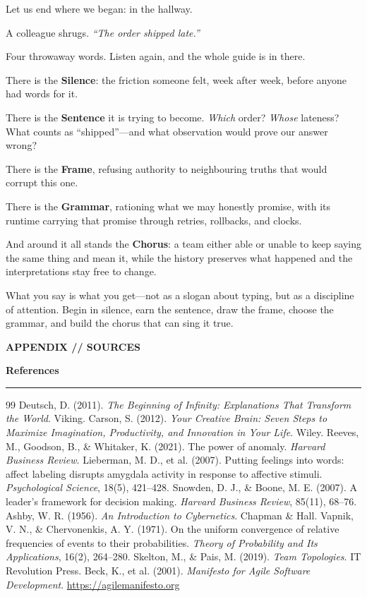 \documentclass[10pt,a4paper]{article}
\newcommand{\SectionTitle}[2]{%
  {\ttfamily\bfseries\footnotesize\textcolor{G2}{#1}\par}\vspace{1.4mm}%
  {\sffamily\bfseries\fontsize{22}{26}\selectfont #2\par}\vspace{2mm}%
  {\color{Ink}\rule{\linewidth}{1pt}\par}\vspace{4mm}%
}
\begin{document}
Let us end where we began: in the hallway.

A colleague shrugs. \emph{“The order shipped late.”}

Four throwaway words. Listen again, and the whole guide is in there.

There is the \textbf{Silence}: the friction someone felt, week after week, before anyone had words for it.

There is the \textbf{Sentence} it is trying to become. \emph{Which} order? \emph{Whose} lateness? What counts as “shipped”—and what observation would prove our answer wrong?

There is the \textbf{Frame}, refusing authority to neighbouring truths that would corrupt this one.

There is the \textbf{Grammar}, rationing what we may honestly promise, with its runtime carrying that promise through retries, rollbacks, and clocks.

And around it all stands the \textbf{Chorus}: a team either able or unable to keep saying the same thing and mean it, while the history preserves what happened and the interpretations stay free to change.

What you say is what you get—not as a slogan about typing, but as a discipline of attention. Begin in silence, earn the sentence, draw the frame, choose the grammar, and build the chorus that can sing it true.

\clearpage
{}
{}
\SectionTitle{APPENDIX // SOURCES}{References}

\begingroup
\small
\renewcommand{\refname}{}
\setlength{\parskip}{0.35em}
\begin{thebibliography}{99}
\setlength{\itemsep}{2pt}
 Deutsch, D. (2011). \emph{The Beginning of Infinity: Explanations That Transform the World}. Viking.
 Carson, S. (2012). \emph{Your Creative Brain: Seven Steps to Maximize Imagination, Productivity, and Innovation in Your Life}. Wiley.
 Reeves, M., Goodson, B., \& Whitaker, K. (2021). The power of anomaly. \emph{Harvard Business Review}.
 Lieberman, M. D., et al. (2007). Putting feelings into words: affect labeling disrupts amygdala activity in response to affective stimuli. \emph{Psychological Science}, 18(5), 421--428.
 Snowden, D. J., \& Boone, M. E. (2007). A leader's framework for decision making. \emph{Harvard Business Review}, 85(11), 68--76.
 Ashby, W. R. (1956). \emph{An Introduction to Cybernetics}. Chapman \& Hall.
 Vapnik, V. N., \& Chervonenkis, A. Y. (1971). On the uniform convergence of relative frequencies of events to their probabilities. \emph{Theory of Probability and Its Applications}, 16(2), 264--280.
 Skelton, M., \& Pais, M. (2019). \emph{Team Topologies}. IT Revolution Press.
 Beck, K., et al. (2001). \emph{Manifesto for Agile Software Development}. \url{https://agilemanifesto.org}
\end{thebibliography}
\endgroup
\end{document}
